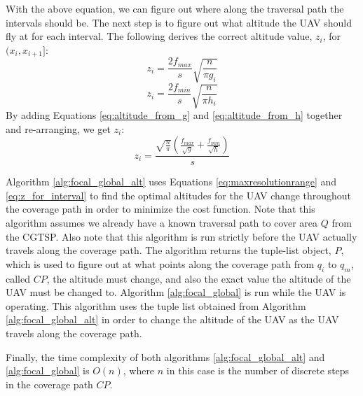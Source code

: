 \documentclass[conference]{IEEEtran}
\theoremstyle{plain}%
\begin{document}
With the above equation, we can figure out where along the traversal path the intervals should be. The next step is to figure out what altitude the UAV should fly at for each interval. The following derives the correct altitude value, $z_i$, for $(x_i,x_{i+1}]$:
\begin{equation} \label{eq:altitude_from_g}
z_i = \frac{2f_{max}}{s} \sqrt{\frac{n}{\pi g_i}}
\end{equation} 
\begin{equation} \label{eq:altitude_from_h}
z_i = \frac{2f_{min}}{s} \sqrt{\frac{n}{\pi h_i}}
\end{equation}
By adding Equations \ref{eq:altitude_from_g} and \ref{eq:altitude_from_h} together and re-arranging, we get $z_i$:
\begin{equation} \label{eq:z_for_interval}
z_i = \frac{ \sqrt{\frac{n}{\pi}} \left( \frac{f_{max}}{\sqrt{g}} + \frac{f_{min}}{\sqrt{h}} \right) }{s}
\end{equation}

Algorithm \ref{alg:focal_global_alt} uses Equations \ref{eq:maxresolutionrange} and \ref{eq:z_for_interval} to find the optimal altitudes for the UAV change throughout the coverage path in order to minimize the cost function. Note that this algorithm assumes we already have a known traversal path to cover area $Q$ from the CGTSP. Also note that this algorithm is run strictly before the UAV actually travels along the coverage path. The algorithm returns the tuple-list object, $P$, which is used to figure out at what points along the coverage path from $q_i$ to $q_m$, called $CP$, the altitude must change, and also the exact value the altitude of the UAV must be changed to. Algorithm \ref{alg:focal_global} is run while the UAV is operating. This algorithm uses the tuple list obtained from Algorithm \ref{alg:focal_global_alt} in order to change the altitude of the UAV as the UAV travels along the coverage path. 

Finally, the time complexity of both algorithms \ref{alg:focal_global_alt} and \ref{alg:focal_global} is $O(n)$, where $n$ in this case is the number of discrete steps in the coverage path $CP$.
\end{document}
